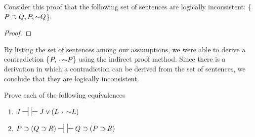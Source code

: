 {Consider this proof that the following set of sentences are logically inconsistent: \{$P \supset Q, P, \mathord{\sim} Q$\}.

\begin{proof}
         
        \open
                 
        \close
                 
                 
                 
\end{proof}

By listing the set of sentences among our assumptions, we were able to derive a contradiction \{$P, \,\cdot\, \mathord{\sim} P$\} using the indirect proof method. Since there 
is a derivation in which a contradiction can be derived from the set of sentences, we conclude that they are logically inconsistent.

\practiceproblems
 	

\noindent\problempart
Prove each of the following equivalences
\begin{enumerate}[label=(\arabic*)]

\item $J \nsststile{}{} \hspace{.5em} \sststile{}{} J\eor (L\eand\enot L)$


\item $P \eif (Q \eif R) \nsststile{}{} \hspace{.5em} \sststile{}{} Q \eif (P \eif R)$



\end{enumerate}}
